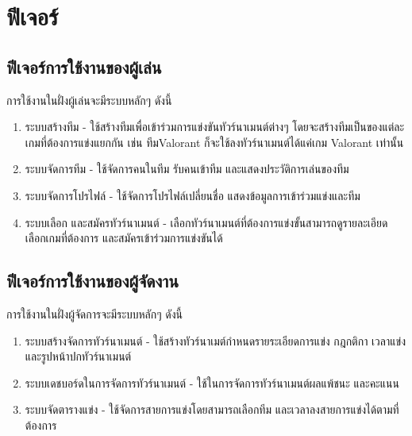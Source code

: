 \section{ฟีเจอร์}
\subsection{ฟีเจอร์การใช้งานของผู้เล่น}
การใช้งานในฝั่งผู้เล่นจะมีระบบหลักๆ ดังนี้
\begin{enumerate}
  \item ระบบสร้างทีม - ใช้สร้างทีมเพื่อเข้าร่วมการแข่งขันทัวร์นาเมนต์ต่างๆ โดยจะสร้างทีมเป็นของแต่ละเกมที่ต้องการแข่งแยกกัน เช่น ทีมValorant ก็จะใช้ลงทัวร์นาเมนต์ได้แค่เกม Valorant เท่านั้น
  \item ระบบจัดการทีม - ใช้จัดการคนในทีม รับคนเข้าทีม และแสดงประวัติการเล่นของทีม
  \item ระบบจัดการโปรไฟล์ - ใช้จัดการโปรไฟล์เปลี่ยนชื่อ แสดงข้อมูลการเข้าร่วมแข่งและทีม
  \item ระบบเลือก และสมัครทัวร์นาเมนต์ - เลือกทัวร์นาเมนต์ที่ต้องการแข่งขั้นสามารถดูรายละเอียด เลือกเกมที่ต้องการ และสมัครเข้าร่วมการแข่งขันได้
\end{enumerate}

\subsection{ฟีเจอร์การใช้งานของผู้จัดงาน}
การใช้งานในฝั่งผู้จัดการจะมีระบบหลักๆ ดังนี้
\begin{enumerate}
  \item ระบบสร้างจัดการทัวร์นาเมนต์ - ใช้สร้างทัวร์นาเมต์กำหนดรายระเอียดการแข่ง กฎกติกา เวลาแข่ง และรูปหน้าปกทัวร์นาเมนต์
  \item ระบบเดชบอร์ดในการจัดการทัวร์นาเมนต์ - ใช้ในการจัดการทัวร์นาเมนต์ผลแพ้ชนะ และคะแนน
  \item ระบบจัดตารางแข่ง - ใช้จัดการสายการแข่งโดยสามารถเลือกทีม และเวลาลงสายการแข่งได้ตามที่ต้องการ
\end{enumerate}

